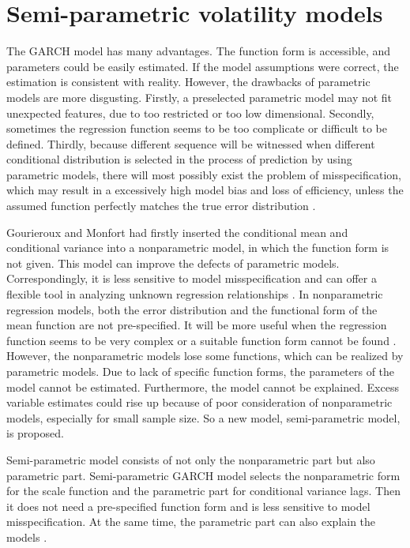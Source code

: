 \chapter{Semi-parametric volatility models}\label{semiparaGarch}

The GARCH model has many advantages. The function form is accessible, and parameters could be easily estimated. If the model assumptions were correct, the estimation is consistent with reality. However, the drawbacks of parametric models are more disgusting. Firstly, a preselected parametric model may not fit unexpected features, due to too restricted or too low dimensional. Secondly, sometimes the regression function seems to be too complicate or difficult to be defined. Thirdly, because different sequence will be witnessed when different conditional distribution is selected in the process of prediction by using parametric models, there will most possibly exist the problem of misspecification, which may result in a excessively high model bias and loss of efficiency, unless the assumed function perfectly matches the true error distribution \citep{Di2011}.

Gourieroux and Monfort had firstly inserted the conditional mean and conditional variance into a nonparametric model, in which the function form is not given. This model can improve the defects of parametric models. Correspondingly, it is less sensitive to model misspecification and can offer a flexible tool in analyzing unknown regression relationships 
\citep{Gourieroux1992}. In nonparametric regression models, both the error distribution and the functional form of the mean function are not pre-specified. It will be more useful when the regression function seems to be very complex or a suitable function form cannot be found \citep{Eubank1993}. However, the nonparametric models lose some functions, which can be realized by parametric models. Due to lack of specific function forms, the parameters of the model cannot be estimated. Furthermore, the model cannot be explained. Excess variable estimates could rise up because of poor consideration of nonparametric models, especially for small sample size. So a new model, semi-parametric model, is proposed.

Semi-parametric model consists of not only the nonparametric part but also parametric part. Semi-parametric GARCH model selects the nonparametric form for the scale function and the parametric part for conditional variance lags. Then it does not need a pre-specified function form and is less sensitive to model misspecification. At the same time, the parametric part can also explain the models \citep{Di2011}.

